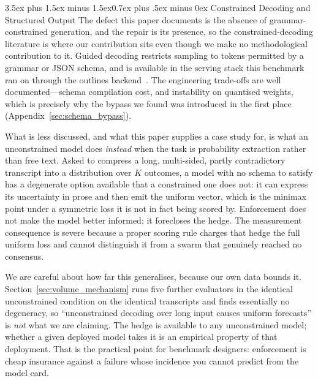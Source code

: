 \documentclass[11pt,journal,onecolumn]{IEEEtran}
\makeatletter
\renewcommand\subsection{\@startsection{subsection}{2}{\z@}%
  {3.5ex plus 1.5ex minus 1.5ex}{0.7ex plus .5ex minus 0ex}%
  {\normalfont\normalsize\bfseries}}
\makeatother
\begin{document}
\subsection{Constrained Decoding and Structured Output}
\label{sec:related_constrained}
The defect this paper documents is the absence of grammar-constrained generation, and the repair is its presence, so the constrained-decoding literature is where our contribution sits even though we make no methodological contribution to it. Guided decoding restricts sampling to tokens permitted by a grammar or JSON schema, and is available in the serving stack this benchmark ran on through the outlines backend~\cite{vllm_guided,vllm}. The engineering trade-offs are well documented---schema compilation cost, and instability on quantised weights, which is precisely why the bypass we found was introduced in the first place (Appendix~\ref{sec:schema_bypass}).

What is less discussed, and what this paper supplies a case study for, is what an unconstrained model does \emph{instead} when the task is probability extraction rather than free text. Asked to compress a long, multi-sided, partly contradictory transcript into a distribution over $K$ outcomes, a model with no schema to satisfy has a degenerate option available that a constrained one does not: it can express its uncertainty in prose and then emit the uniform vector, which is the minimax point under a symmetric loss it is not in fact being scored by. Enforcement does not make the model better informed; it forecloses the hedge. The measurement consequence is severe because a proper scoring rule charges that hedge the full uniform loss and cannot distinguish it from a swarm that genuinely reached no consensus.

We are careful about how far this generalises, because our own data bounds it. Section~\ref{sec:volume_mechanism} runs five further evaluators in the identical unconstrained condition on the identical transcripts and finds essentially no degeneracy, so ``unconstrained decoding over long input causes uniform forecasts'' is \emph{not} what we are claiming. The hedge is available to any unconstrained model; whether a given deployed model takes it is an empirical property of that deployment. That is the practical point for benchmark designers: enforcement is cheap insurance against a failure whose incidence you cannot predict from the model card.
\end{document}
